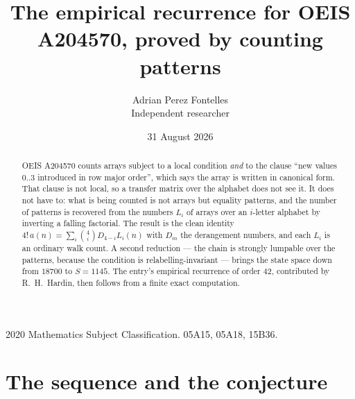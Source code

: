 \documentclass[11pt,a4paper]{article}
\title{The empirical recurrence for OEIS A204570, proved by counting patterns}
\author{Adrian Perez Fontelles\\ \small Independent researcher}
\date{31 August 2026}
\theoremstyle{plain}
\theoremstyle{definition}
\begin{document}
\maketitle

\begin{abstract}
OEIS A204570 counts arrays subject to a local condition \emph{and} to the clause ``new values
$0..3$ introduced in row major order'', which says the array is written in canonical
form. That clause is not local, so a transfer matrix over the alphabet does not see it. It
does not have to: what is being counted is not arrays but equality patterns, and the number
of patterns is recovered from the numbers $L_i$ of arrays over an $i$-letter alphabet by
inverting a falling factorial. The result is the clean identity
$4!\,a(n)=\sum_i\binom{4}{i}D_{4-i}L_i(n)$ with $D_m$ the derangement numbers,
and each $L_i$ is an ordinary walk count. A second reduction --- the chain is strongly
lumpable over the patterns, because the condition is relabelling-invariant --- brings the
state space down from $18700$ to $S=1145$. The entry's empirical recurrence of order
$42$, contributed by R.~H.~Hardin, then follows from a finite exact computation.
\end{abstract}

\noindent\small 2020 Mathematics Subject Classification. 05A15, 05A18, 15B36.\normalsize

\section{The sequence and the conjecture}
\end{document}
